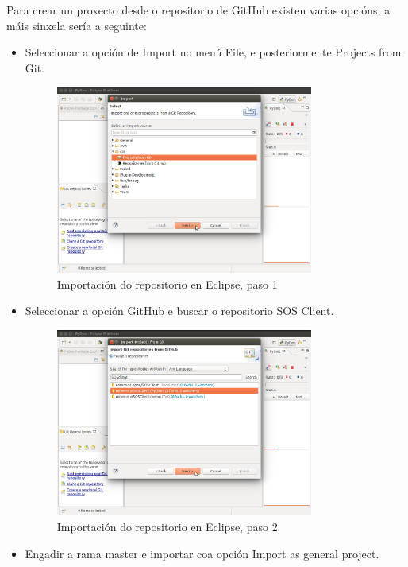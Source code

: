 Para crear un proxecto desde o repositorio de GitHub existen varias opcións, a máis sinxela sería a seguinte:
\newpage
\begin{itemize}
\item Seleccionar a opción de Import no menú File, e posteriormente Projects from Git.
\begin{figure}[H]
\centering
\includegraphics[width=0.8\textwidth]{images/manualtecnico/import_project01.png}
\caption{Importación do repositorio en Eclipse, paso 1}
\label{fig:import_project01}
\end{figure}
\item Seleccionar a opción GitHub e buscar o repositorio SOS Client.
\begin{figure}[H]
\centering
\includegraphics[width=0.8\textwidth]{images/manualtecnico/import_project02.png}
\caption{Importación do repositorio en Eclipse, paso 2}
\label{fig:import_project02}
\end{figure}
\item Engadir a rama master e importar coa opción Import as general project.
\begin{figure}[H]

\end{figure}
\end{itemize}
